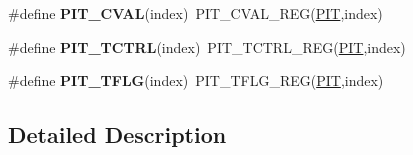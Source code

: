 \begin{DoxyCompactItemize}
\item 
\#define {\bfseries P\+I\+T\+\_\+\+C\+V\+AL}(index)~P\+I\+T\+\_\+\+C\+V\+A\+L\+\_\+\+R\+EG(\hyperlink{group__PIT__Peripheral__Access__Layer_gaf181c9e6602b6432a0bf1a9243808968}{P\+IT},index)\hypertarget{group__PIT__Register__Accessor__Macros_ga83f3e2fa179556c64aec46ba2a4ff9c2}{}\label{group__PIT__Register__Accessor__Macros_ga83f3e2fa179556c64aec46ba2a4ff9c2}

\item 
\#define {\bfseries P\+I\+T\+\_\+\+T\+C\+T\+RL}(index)~P\+I\+T\+\_\+\+T\+C\+T\+R\+L\+\_\+\+R\+EG(\hyperlink{group__PIT__Peripheral__Access__Layer_gaf181c9e6602b6432a0bf1a9243808968}{P\+IT},index)\hypertarget{group__PIT__Register__Accessor__Macros_ga8208039ad04ced0f69ccc2cf4efd8e67}{}\label{group__PIT__Register__Accessor__Macros_ga8208039ad04ced0f69ccc2cf4efd8e67}

\item 
\#define {\bfseries P\+I\+T\+\_\+\+T\+F\+LG}(index)~P\+I\+T\+\_\+\+T\+F\+L\+G\+\_\+\+R\+EG(\hyperlink{group__PIT__Peripheral__Access__Layer_gaf181c9e6602b6432a0bf1a9243808968}{P\+IT},index)\hypertarget{group__PIT__Register__Accessor__Macros_ga8a2ba0e5f954639237f66f2613c60023}{}\label{group__PIT__Register__Accessor__Macros_ga8a2ba0e5f954639237f66f2613c60023}

\end{DoxyCompactItemize}


\subsection{Detailed Description}
